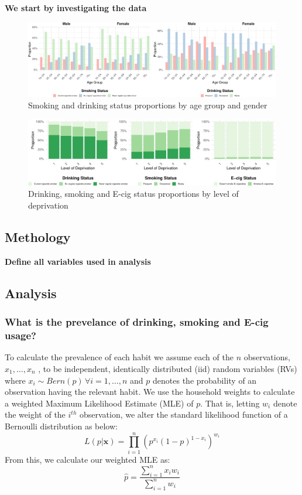 \documentclass[
  11pt,
]{article}
\begin{document}
\textbf{We start by investigating the data}

\begin{figure}[H]
\includegraphics{Coursework_files/figure-latex/output smoking and drinking by age plot-1} \caption{Smoking and drinking status proportions by age group and gender}\label{fig:output smoking and drinking by age plot}
\end{figure}

\begin{figure}[H]
\includegraphics{Coursework_files/figure-latex/output deprivation plot-1} \caption{Drinking, smoking and E-cig status proportions by level of deprivation}\label{fig:output deprivation plot}
\end{figure}

\subsection{Methology}\label{methology}

\textbf{Define all variables used in analysis}

\subsection{Analysis}\label{analysis}

\subsubsection{What is the prevelance of drinking, smoking and E-cig
usage?}\label{what-is-the-prevelance-of-drinking-smoking-and-e-cig-usage}

To calculate the prevalence of each habit we assume each of the \(n\)
observations, \(x_1,…,x_n\) , to be independent, identically distributed
(iid) random variables (RVs) where
\(x_i \sim Bern(p)\, \forall i=1,…,n\) and \(p\) denotes the probability
of an observation having the relevant habit. We use the household
weights to calculate a weighted Maximum Likelihood Estimate (MLE) of
\(p\). That is, letting \(w_i\) denote the weight of the \(i^{th}\)
observation, we alter the standard likelihood function of a Bernoulli
distribution as below:
\[L(p|\textbf{x}) = \prod_{i = 1}^{n} (p^{x_i}(1-p)^{1-x_i})^{w_i}\]
From this, we calculate our weighted MLE as:
\[\widehat{p} = \frac{\sum_{i=1}^{n} x_iw_i}{\sum_{i=1}^{n} w_i}\]
\end{document}

